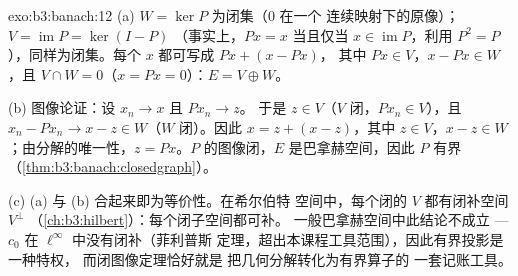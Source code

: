 \begin{solution}{exo:b3:banach:12}
(a) $W = \ker P$ 为闭集（$0$ 在一个
连续映射下的原像）；$V = \operatorname{im}P = \ker(I - P)$
（事实上，$Px = x$ 当且仅当 $x \in \operatorname{im}P$，利用 $P^2 =
P$），同样为闭集。每个 $x$ 都可写成 $Px + (x - Px)$，
其中 $Px \in V$，$x - Px \in W$，且 $V \cap W = 0$（$x = Px
= 0$）：$E = V \oplus W$。

(b) 图像论证：设 $x_n \to x$ 且 $Px_n \to z$。
于是 $z \in V$（$V$ 闭，$Px_n \in V$），且 $x_n - Px_n \to
x - z \in W$（$W$ 闭）。因此 $x = z + (x - z)$，其中 $z \in
V$，$x - z \in W$；由分解的唯一性，$z =
Px$。$P$ 的图像闭，$E$ 是巴拿赫空间，因此 $P$
有界（\cref{thm:b3:banach:closedgraph}）。

(c) (a) 与 (b) 合起来即为等价性。在希尔伯特
空间中，每个闭的 $V$ 都有闭补空间 $V^\perp$
（\cref{ch:b3:hilbert}）：每个闭子空间都可补。
一般巴拿赫空间中此结论不成立 --- $c_0$
在 $\ell^\infty$ 中没有闭补（菲利普斯
定理，超出本课程工具范围），因此有界投影是一种特权，
而闭图像定理恰好就是
把几何分解转化为有界算子的
一套记账工具。
\end{solution}

